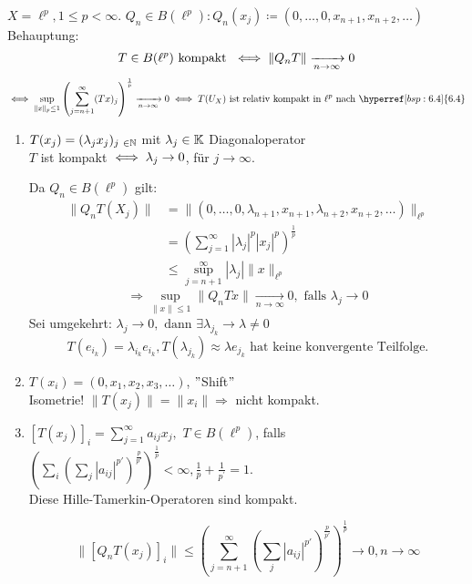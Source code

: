 \begin{beispiel} \label{bsp:7.2}
	$X = \ell^{p}, 1 \leq p < \infty.$ $Q_{n} \in B(\ell^{p}): Q_{n}(x_{j}) \coloneqq (0, \dotsc, 0, x_{n + 1}, x_{n + 2}, \dotsc)$ \\
	Behauptung: 
	\[ T \in B(\ell^{p}) \text{ kompakt  } \iff \| Q_{n} T \| \xrightarrow[n \rightarrow \infty]{} 0 \]
	\[ \gdw \sup_{\|x\|_{p} \leq 1} \left( \sum_{j = n + 1}^{\infty} (Tx)_{j} \right)^{\frac{1}{p}} \xrightarrow[n \rightarrow \infty]{} 0 \gdw T(U_{X}) \text{ ist relativ kompakt in } \ell^{p} \text{ nach } \hyperref[bsp:6.4]{6.4} \]
	
	\begin{enumerate}[label=\alph*\upshape)]
		\item $T(x_{j}) = (\lambda_{j} x_{j})_{j \in \MdN}$ mit $\lambda_{j} \in \mathbb{K}$ Diagonaloperator \\
			$T$ ist kompakt $\iff \lambda_{j} \rightarrow 0$, für $j \rightarrow \infty$.
			\begin{beweis}
				Da $Q_{n} \in B(\ell^{p})$ gilt:
				\begin{align*}
					 \| Q_{n} T(X_{j}) \| & = \| (0, \dotsc, 0, \lambda_{n + 1}, x_{n + 1}, \lambda_{n + 2}, x_{n + 2}, \dotsc ) \|_{\ell^{p}} \\
										 & = \left( \sum_{j = 1}^{\infty} |\lambda_{j}|^{p} |x_{j}|^{p} \right)^{\frac{1}{p}} \\
										 & \leq 	\sup_{j = n + 1}^{\infty} |\lambda_{j}| \|x \|_{\ell^{p}}			
				\end{align*}
				\[ \Rightarrow \sup_{\| x \| \leq 1} \| Q_{n} T x \| \xrightarrow[n \rightarrow \infty]{} 0, \text{ falls } \lambda_{j} \rightarrow 0 \]
				Sei umgekehrt: $\lambda_{j} \rightarrow 0, \text{ dann } \exists \lambda_{j_{k}} \rightarrow \lambda \neq 0 $
				\[ T(e_{i_{k}}) = \lambda_{i_{k}} e_{i_{k}}, T(\lambda_{j_{k}}) \approx \lambda e_{j_{k}} \text{ hat keine konvergente Teilfolge.} \]
			\end{beweis}
		\item $T(x_{i})= (0, x_{1}, x_{2}, x_{3}, \dotsc)$, $"$Shift$"$ \\
			Isometrie! $\| T(x_{j}) \| = \| x_{i} \| \Rightarrow$ nicht kompakt.
		\item $\left[ T(x_{j}) \right]_{i} = \sum_{j = 1}^{\infty} a_{ij} x_{j},$ $T \in B(\ell^{p})$, falls $\left( \sum_{i} \left( \sum_{j} | a_{ij} |^{p'} \right)^{\frac{p}{p'}} \right)^{\frac{1}{p}} < \infty, \frac{1}{p} + \frac{1}{p^{'}} = 1. $\\
			Diese Hille-Tamerkin-Operatoren sind kompakt.
			\begin{beweis}
				\[ \| \left[ Q_{n} T(x_{j}) \right]_{i} \| \leq \left( \sum_{j = n + 1}^{\infty} \left( \sum_{j} |a_{ij}|^{p'} \right)^{\frac{p}{p'}} \right)^{\frac{1}{p}} \rightarrow 0, n \rightarrow \infty \]
			\end{beweis}

	\end{enumerate}
\end{beispiel}


